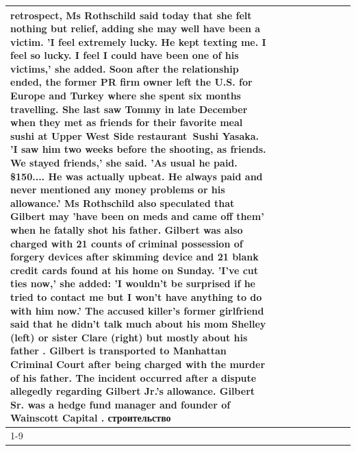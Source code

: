 \begin{table}[H]
\begin{tabular}{lllrlllll}
retrospect, Ms Rothschild said today that she felt nothing but relief, adding she may well have been a victim. 'I feel extremely lucky. He kept texting me. I feel so lucky. I feel I could have been one of his victims,' she added. Soon after the relationship ended, the former PR firm owner left the U.S. for Europe and Turkey where she spent six months  travelling. She last saw Tommy in late December when they met as friends for their favorite meal sushi at Upper West Side restaurant Sushi Yasaka. 'I saw him two weeks before the shooting, as friends. We stayed friends,' she said. 'As usual he paid. \$150.... He was actually upbeat. He always paid and never mentioned any money problems or his allowance.' Ms Rothschild also speculated that Gilbert may 'have been on meds and came off them' when he fatally shot his father. Gilbert was also charged with 21 counts of criminal possession of forgery devices after skimming device and 21 blank credit cards found at his home on Sunday. 'I've cut ties now,' she added: 'I wouldn’t be surprised if he tried to contact me but I won’t have anything to do with him now.' The accused killer's former girlfriend said that he didn't talk much about his mom Shelley (left) or sister Clare (right) but mostly about his father . Gilbert is transported to Manhattan Criminal Court  after being charged with the murder of his father. The incident occurred after a dispute allegedly regarding Gilbert Jr.'s allowance. Gilbert Sr. was a hedge fund manager and founder of Wainscott Capital . строительство \\
\cline{1-9}

\end{tabular}
\end{table}
